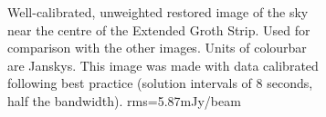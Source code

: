 \begin{figure}[t!]
\centering
\begin{subfigure}{.43\textwidth}
\caption{\label{image.3c295.goodcal} Well-calibrated, unweighted restored image of the sky near the centre of the Extended Groth Strip. Used for comparison with the other images. {Units of colourbar are Janskys}. This image was made with data calibrated following best practice (solution intervals of 8 seconds, half the bandwidth). rms=5.87mJy/beam}
\end{subfigure}
\hfill
\begin{subfigure}{.43\textwidth}

\end{subfigure}
\end{figure}
